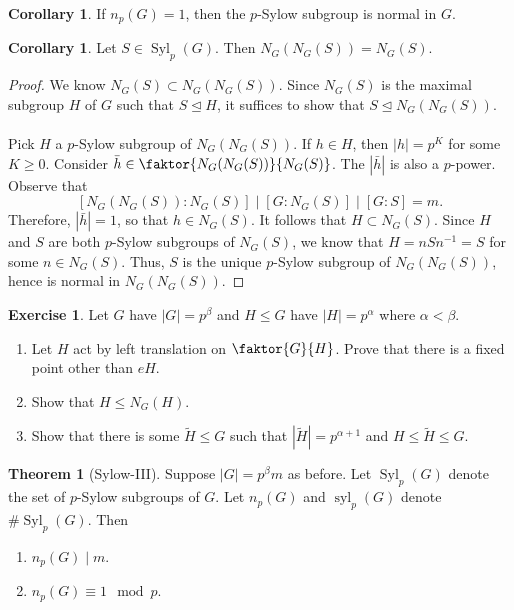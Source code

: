 \documentclass[10pt,letterpaper,cm]{nupset}
\theoremstyle{definition}
\theoremstyle{theorem}
\newtheorem{theorem}[definition]{Theorem}
\newtheorem{corollary}[definition]{Corollary}
\newtheorem{exercise}[definition]{Exercise}
\theoremstyle{remark}
\newcommand{\1}{\mathbf{1}}
\newcommand{\0}{\vec 0}
\DeclareMathOperator{\syl}{syl}
\DeclareMathOperator{\Syl}{Syl}
\begin{document}
\begin{corollary}
If $n_p(G)=1$, then the $p$-Sylow subgroup is normal in $G$.
\end{corollary}

\begin{corollary}
Let $S\in \Syl_p(G)$. Then $N_G(N_G(S)) = N_G(S)$.
\end{corollary}

\begin{proof}
We know $N_G(S) \subset N_G(N_G(S))$. Since $N_G(S)$ is the maximal subgroup $H$ of $G$ such that $S\unlhd H$, it suffices to show that $S\unlhd N_G(N_G(S))$.
\\ \\
Pick $H$ a $p$-Sylow subgroup of $N_G(N_G(S))$. If $h\in H$, then $|h| =p^K$ for some $K\geq 0$. Consider $\bar{h} \in \faktor{N_G(N_G(S))}{N_G(S)}$. The $|\bar{h}|$ is also a $p$-power. Observe that $$[N_G(N_G(S)): N_G(S)]\mid [G: N_G(S)] \mid [G:S]=m.$$ Therefore, $|\bar{h}| =1$, so that $h \in N_G(S)$. It follows that $H \subset N_G(S)$. Since $H$ and $S$ are both $p$-Sylow subgroups of $N_G(S)$, we know that $H = nSn^{-1} = S$ for some $n\in N_G(S)$. Thus, $S$ is the unique $p$-Sylow subgroup of $N_G(N_G(S))$, hence is normal in $N_G(N_G(S))$.
\end{proof}

\begin{exercise} Let $G$ have $|G|=p^{\beta}$ and $H\leq G$ have $|H|=p^{\alpha}$ where $\alpha < \beta$. 
\begin{enumerate}
\item Let $H$ act by left translation on $\faktor{G}{H}$. Prove that there is a fixed point other than $eH$.
\item Show that $H\leq N_G(H)$.
\item Show that there is some $\tilde{H} \leq G$ such that $|\tilde{H}| =p^{\alpha+1}$ and $H \leq \tilde{H} \leq G$.
\end{enumerate}
\end{exercise}

\begin{theorem}[Sylow-III]
Suppose $|G|= p^{\beta}m$ as before. Let $\Syl_p(G)$ denote the set of $p$-Sylow subgroups of $G$. Let $n_p(G)$ and $\syl_p(G)$ denote $\# \Syl_p(G)$. Then
\begin{enumerate}
\item $n_p(G) \mid m$.
\item $n_p(G) \equiv 1 \mod p$.
\end{enumerate}
\end{theorem}
\end{document}
